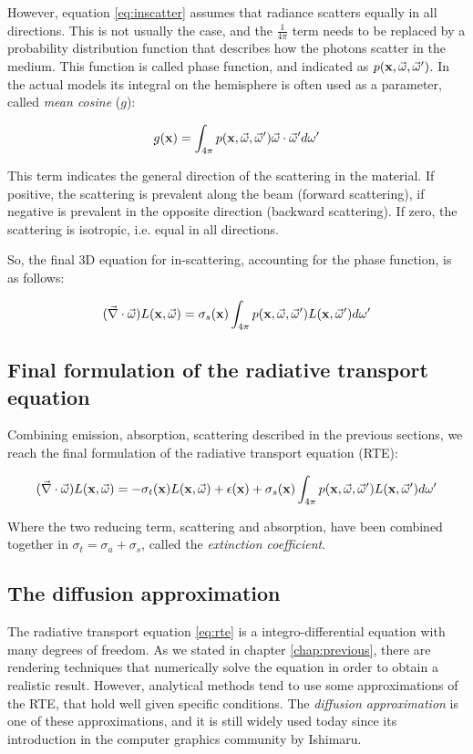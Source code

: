 However, equation \ref{eq:inscatter} assumes that radiance scatters equally in all directions. This is not usually the case, and the $\frac{1}{4 \pi}$ term needs to be replaced by a probability distribution function that describes how the photons scatter in the medium. This function is called phase function, and indicated as $p(\mathbf{x}, \vec{\omega}, \vec{\omega}')$. In the actual models its integral on the hemisphere is often used as a parameter, called \emph{mean cosine} ($g$):

$$
g(\mathbf{x}) = \int_{4 \pi} p(\mathbf{x}, \vec{\omega}, \vec{\omega}') \vec{\omega} \cdot \vec{\omega}' d \omega'
$$

This term indicates the general direction of the scattering in the material. If positive, the scattering is prevalent along the beam (forward scattering), if negative is prevalent in the opposite direction (backward scattering). If zero, the scattering is isotropic, i.e. equal in all directions.

So, the final 3D equation for in-scattering, accounting for the phase function, is as follows:

\begin{equation*}
(\vec{\nabla} \cdot \vec{\omega}) L(\mathbf{x}, \vec{\omega}) = \sigma_s(\mathbf{x}) \int_{4\pi} p(\mathbf{x}, \vec{\omega}, \vec{\omega}') L(\mathbf{x},\vec{\omega}') d\omega'	
\end{equation*}

\subsection{Final formulation of the radiative transport equation}
Combining emission, absorption, scattering described in the previous sections, we reach the final formulation of the radiative transport equation (RTE):

\begin{equation}
(\vec{\nabla} \cdot \vec{\omega}) L(\mathbf{x}, \vec{\omega}) =   -\sigma_t(\mathbf{x}) L(\mathbf{x}, \vec{\omega}) + \epsilon(\mathbf{x}) + \sigma_s(\mathbf{x}) \int_{4\pi} p(\mathbf{x}, \vec{\omega}, \vec{\omega}') L(\mathbf{x},\vec{\omega}') d\omega'
\label{eq:rte}
\end{equation}

Where the two reducing term, scattering and absorption, have been combined together in $\sigma_t = \sigma_a + \sigma_s$, called the \emph{extinction coefficient}.


\subsection{The diffusion approximation}
The radiative transport equation \ref{eq:rte} is a integro-differential equation with many degrees of freedom. As we stated in chapter \ref{chap:previous}, there are rendering techniques that numerically solve the equation in order to obtain a realistic result. However, analytical methods tend to use some approximations of the RTE, that hold well given specific conditions. The \emph{diffusion approximation} is one of these approximations, and it is still widely used today since its introduction in the computer graphics community by Ishimaru\cite{books/daglib/0093591}. 

